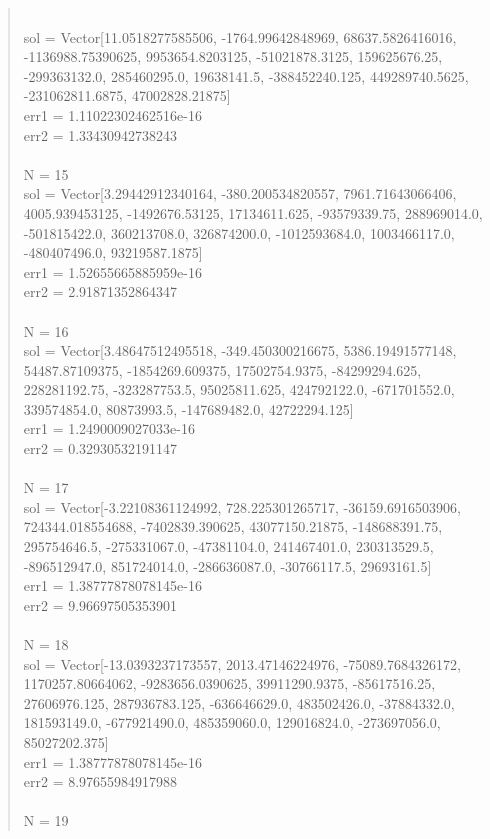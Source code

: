 \documentclass[letterpaper,12pt]{article}
\begin{document}
\begin{quote}
\\sol = Vector[11.0518277585506, -1764.99642848969, 68637.5826416016, -1136988.75390625, 9953654.8203125, -51021878.3125, 159625676.25, -299363132.0, 285460295.0, 19638141.5, -388452240.125, 449289740.5625, -231062811.6875, 47002828.21875]
\\err1 = 1.11022302462516e-16
\\err2 = 1.33430942738243
\\
\\N = 15
\\sol = Vector[3.29442912340164, -380.200534820557, 7961.71643066406, 4005.939453125, -1492676.53125, 17134611.625, -93579339.75, 288969014.0, -501815422.0, 360213708.0, 326874200.0, -1012593684.0, 1003466117.0, -480407496.0, 93219587.1875]
\\err1 = 1.52655665885959e-16
\\err2 = 2.91871352864347
\\
\\N = 16
\\sol = Vector[3.48647512495518, -349.450300216675, 5386.19491577148, 54487.87109375, -1854269.609375, 17502754.9375, -84299294.625, 228281192.75, -323287753.5, 95025811.625, 424792122.0, -671701552.0, 339574854.0, 80873993.5, -147689482.0, 42722294.125]
\\err1 = 1.2490009027033e-16
\\err2 = 0.32930532191147
\\
\\N = 17
\\sol = Vector[-3.22108361124992, 728.225301265717, -36159.6916503906, 724344.018554688, -7402839.390625, 43077150.21875, -148688391.75, 295754646.5, -275331067.0, -47381104.0, 241467401.0, 230313529.5, -896512947.0, 851724014.0, -286636087.0, -30766117.5, 29693161.5]
\\err1 = 1.38777878078145e-16
\\err2 = 9.96697505353901
\\
\\N = 18
\\sol = Vector[-13.0393237173557, 2013.47146224976, -75089.7684326172, 1170257.80664062, -9283656.0390625, 39911290.9375, -85617516.25, 27606976.125, 287936783.125, -636646629.0, 483502426.0, -37884332.0, 181593149.0, -677921490.0, 485359060.0, 129016824.0, -273697056.0, 85027202.375]
\\err1 = 1.38777878078145e-16
\\err2 = 8.97655984917988
\\
\\N = 19

\end{quote}
\end{document}
